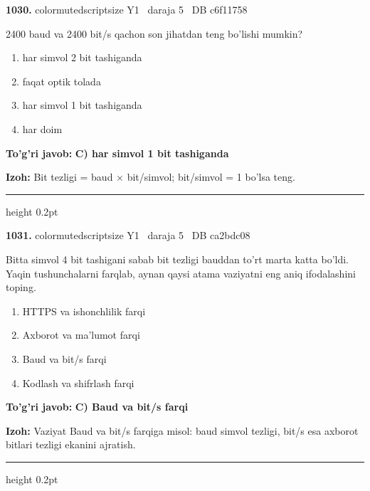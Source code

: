 \documentclass[10pt,a4paper,oneside]{article}
\begin{document}
\noindent\textbf{\color{ink}1030.}  {color{muted}scriptsize Y1 \textbullet\ daraja 5 \textbullet\ DB c6f11758}
\par
2400 baud va 2400 bit/s qachon son jihatdan teng bo'lishi mumkin?
\begin{enumerate}[label=\Alph*),leftmargin=9mm]
\item har simvol 2 bit tashiganda
\item faqat optik tolada
\item har simvol 1 bit tashiganda
\item har doim
\end{enumerate}
\begin{tcolorbox}[enhanced,breakable,colback=teal!4,colframe=teal!50!black,boxrule=0.5pt,arc=1.1mm,left=3mm,right=3mm,top=1.7mm,bottom=1.7mm,before skip=2mm,after skip=2mm]
\textbf{\color{teal}To'g'ri javob:} \textbf{C) har simvol 1 bit tashiganda}
\par\smallskip
\textbf{Izoh:} Bit tezligi = baud \ensuremath{\times} bit/simvol; bit/simvol = 1 bo'lsa teng.
\end{tcolorbox}
\vspace{2mm}\hrule height 0.2pt \vspace{3mm}

\noindent\textbf{\color{ink}1031.}  {color{muted}scriptsize Y1 \textbullet\ daraja 5 \textbullet\ DB ca2bdc08}
\par
Bitta simvol 4 bit tashigani sabab bit tezligi bauddan to'rt marta katta bo'ldi. Yaqin tushunchalarni farqlab, aynan qaysi atama vaziyatni eng aniq ifodalashini toping.
\begin{enumerate}[label=\Alph*),leftmargin=9mm]
\item HTTPS va ishonchlilik farqi
\item Axborot va ma'lumot farqi
\item Baud va bit/s farqi
\item Kodlash va shifrlash farqi
\end{enumerate}
\begin{tcolorbox}[enhanced,breakable,colback=teal!4,colframe=teal!50!black,boxrule=0.5pt,arc=1.1mm,left=3mm,right=3mm,top=1.7mm,bottom=1.7mm,before skip=2mm,after skip=2mm]
\textbf{\color{teal}To'g'ri javob:} \textbf{C) Baud va bit/s farqi}
\par\smallskip
\textbf{Izoh:} Vaziyat Baud va bit/s farqiga misol: baud simvol tezligi, bit/s esa axborot bitlari tezligi ekanini ajratish.
\end{tcolorbox}
\vspace{2mm}\hrule height 0.2pt \vspace{3mm}
\clearpage
\end{document}
